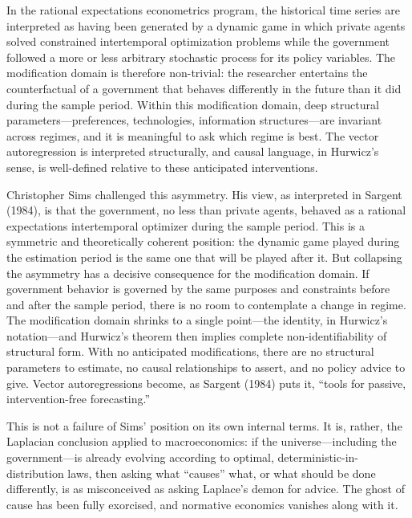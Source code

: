 \documentclass[12pt]{article}
\begin{document}
In the rational expectations econometrics program, the historical time series are
interpreted as having been generated by a dynamic game in which private agents solved
constrained intertemporal optimization problems while the government followed a more or
less arbitrary stochastic process for its policy variables.  The modification domain is
therefore non-trivial: the researcher entertains the counterfactual of a government that
behaves differently in the future than it did during the sample period.  Within this
modification domain, deep structural parameters---preferences, technologies, information
structures---are invariant across regimes, and it is meaningful to ask which regime is best.
The vector autoregression is interpreted structurally, and causal language, in Hurwicz's
sense, is well-defined relative to these anticipated interventions.

Christopher Sims challenged this asymmetry.  His view, as interpreted in
Sargent (1984), is that the government, no less than private agents, behaved as a
rational expectations intertemporal optimizer during the sample period.  This is a
symmetric and theoretically coherent position: the dynamic game played during the
estimation period is the same one that will be played after it.  But collapsing the
asymmetry has a decisive consequence for the modification domain.  If government behavior
is governed by the same purposes and constraints before and after the sample period, there
is no room to contemplate a change in regime.  The modification domain shrinks to a single
point---the identity, in Hurwicz's notation---and Hurwicz's theorem then implies complete
non-identifiability of structural form.  With no anticipated modifications, there are no
structural parameters to estimate, no causal relationships to assert, and no policy advice
to give.  Vector autoregressions become, as Sargent (1984) puts it, ``tools for
passive, intervention-free forecasting.''

This is not a failure of Sims' position on its own internal terms.  It is, rather, the
Laplacian conclusion applied to macroeconomics: if the universe---including the
government---is already evolving according to optimal, deterministic-in-distribution laws,
then asking what ``causes'' what, or what should be done differently, is as misconceived as
asking Laplace's demon for advice.  The ghost of cause has been fully exorcised, and
normative economics vanishes along with it.
\end{document}
